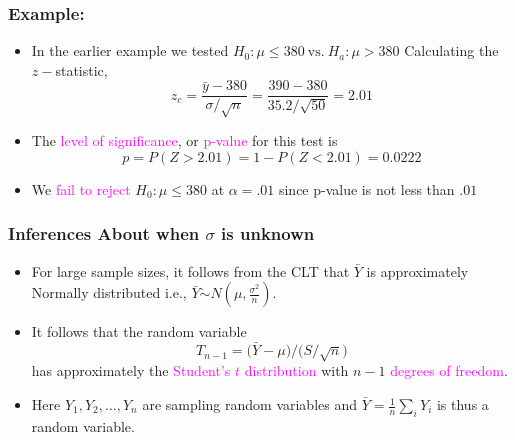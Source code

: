 \documentclass[xcolor=dvipsnames,12pt]{beamer}
\begin{document}
\begin{frame}
\frametitle{Example:}
\begin{itemize}
\item In the earlier example we tested $H_0: \mu \leq 380\ \mbox{vs.}\ H_a: \mu > 380 $
Calculating the $z-$statistic,
$$
  z_c = \frac{\bar{y}-380}{\sigma/\sqrt{n}}= \frac{390-380}{35.2/\sqrt{50}} = 2.01 $$
  
\item The \textcolor{magenta}{level of significance}, or \textcolor{magenta}{p-value} for this test is
$$  p= P(Z > 2.01)= 1- P(Z < 2.01)= 0.0222$$
\item We \textcolor{magenta}{fail to reject} $H_0: \mu \leq 380$ at $\alpha=.01$ since p-value
is not less than $.01$
\end{itemize}
\end{frame}


\begin{frame}
\frametitle{{Inferences About \boldmath{$\mu$} when $\sigma$ is unknown}}
\begin{itemize}
\item For large sample sizes,  it follows from the CLT that $\bar{Y}$ is 
approximately Normally distributed i.e., $\bar{Y} \dot{\sim}
N(\mu,\frac{\sigma^2}{n})$. 
\item It follows that the random variable
$$
  T_{n-1} =\Big( \bar{Y} - \mu \Big) / \Big( S/\sqrt{n} \Big) 
$$
has approximately the \textcolor{magenta}{Student's $t$}
\textcolor{magenta}{distribution} with {$n-1$}
\textcolor{magenta}{degrees of freedom}. 

\item Here  $Y_1, Y_2, \ldots,Y_n$ are sampling random variables and $\bar{Y} =
\frac{1}{n} \displaystyle\sum_i Y_i$ is thus a random variable.
\end{itemize}
\end{frame}
\end{document}
